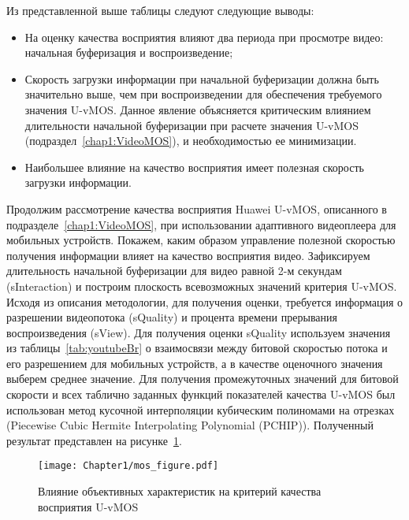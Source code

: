 Из представленной выше таблицы следуют следующие выводы:
\begin{itemize}
	\item На оценку качества восприятия влияют два периода при просмотре видео: начальная буферизация и воспроизведение;
	\item Скорость загрузки информации при начальной буферизации должна быть значительно выше, чем при воспроизведении для обеспечения требуемого значения U-vMOS. Данное явление объясняется критическим влиянием длительности начальной буферизации при расчете значения U-vMOS (подраздел~\ref{chap1:VideoMOS}), и необходимостью ее минимизации.
	\item Наибольшее влияние на качество восприятия имеет полезная скорость загрузки информации.
\end{itemize}

Продолжим рассмотрение качества восприятия Huawei U-vMOS, описанного в подразделе~\ref{chap1:VideoMOS}, при использовании адаптивного видеоплеера для мобильных устройств. Покажем, каким образом управление полезной скоростью получения информации влияет на качество восприятия видео. Зафиксируем длительность начальной буферизации для видео равной 2-м секундам (sInteraction) и построим плоскость всевозможных значений критерия U-vMOS. Исходя из описания методологии, для получения оценки, требуется информация о разрешении видеопотока (sQuality) и процента времени прерывания воспроизведения (sView). Для получения оценки sQuality используем значения из таблицы~\ref{tab:youtubeBr} о взаимосвязи между битовой скоростью потока и его разрешением для мобильных устройств, а в качестве оценочного значения выберем среднее значение. Для получения промежуточных значений для битовой скорости и всех таблично заданных функций показателей качества U-vMOS был использован метод кусочной интерполяции кубическим полиномами на отрезках (Piecewise Cubic Hermite Interpolating Polynomial (PCHIP)). Полученный результат представлен на рисунке~\ref{fig:UvMOSDepending}.

\begin{figure}[htbp]
\begin{center}
\texttt{[image: Chapter1/mos\_figure.pdf]}
\caption{Влияние объективных характеристик на критерий качества восприятия U-vMOS}
\label{fig:UvMOSDepending}
\end{center}
\end{figure}

